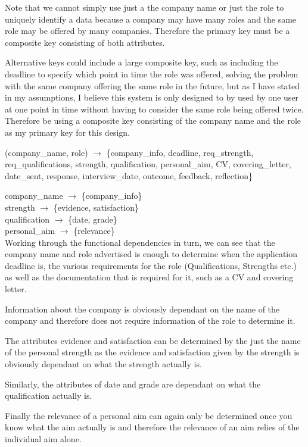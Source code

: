\documentclass{article}
\begin{document}
Note that we cannot simply use just a the company name or just the role to uniquely identify a data because a company may have many roles and the same role may be offered by many companies. Therefore the primary key must be a composite key consisting of both attributes. 

Alternative keys could include a large composite key, such as including the deadline to specify which point in time the role was offered, solving the problem with the same company offering the same role in the future, but as I have stated in my assumptions, I believe this system is only designed to by used by one user at one point in time without having to consider the same role being offered twice. Therefore be using a composite key consisting of the company name and the role as my primary key for this design.

(company\_name, role) $\rightarrow$ \{company\_info, deadline, req\_strength, req\_qualifications, strength, qualification, personal\_aim, CV, covering\_letter, date\_sent, response, interview\_date, outcome, feedback, reflection\}

company\_name $\rightarrow$ \{company\_info\}\\
strength $\rightarrow$ \{evidence, satisfaction\}\\
qualification $\rightarrow$ \{date, grade\}\\
personal\_aim $\rightarrow$ \{relevance\}\\

Working through the functional dependencies in turn, we can see that the company name and role advertised is enough to determine when the application deadline is, the various requirements for the role (Qualifications, Strengths etc.) as well as the documentation that is required for it, such as a CV and covering letter. 

Information about the company is obviously dependant on the name of the company and therefore does not require information of the role to determine it.

The attributes evidence and satisfaction can be determined by the just the name of the personal strength as the evidence and satisfaction given by the strength is obviously dependant on what the strength actually is.

Similarly, the attributes of date and grade are dependant on what the qualification actually is.

Finally the relevance of a personal aim can again only be determined once you know what the aim actually is and therefore the relevance of an aim relies of the individual aim alone.
\end{document}
